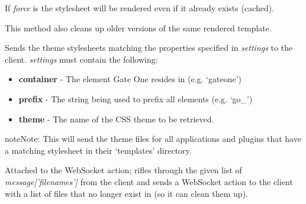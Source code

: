 \documentclass[letterpaper,10pt,openany]{sphinxmanual}
\begin{document}
\begin{fulllineitems}
\begin{fulllineitems}
If \emph{force} is  the stylesheet will be rendered even if it
already exists (cached).

This method also cleans up older versions of the same rendered template.

\end{fulllineitems}


\begin{fulllineitems}
\label{Developer/server:gateone.core.server.ApplicationWebSocket.get_theme}
Sends the theme stylesheets matching the properties specified in
\emph{settings} to the client.  \emph{settings} must contain the following:
\begin{itemize}
\item {} 
\textbf{container} - The element Gate One resides in (e.g. `gateone')

\item {} 
\textbf{prefix} - The string being used to prefix all elements (e.g. `go\_')

\item {} 
\textbf{theme} - The name of the CSS theme to be retrieved.

\end{itemize}

\begin{notice}{note}{Note:}
This will send the theme files for all applications and plugins that
have a matching stylesheet in their `templates' directory.
\end{notice}

\end{fulllineitems}


\begin{fulllineitems}
\label{Developer/server:gateone.core.server.ApplicationWebSocket.cache_cleanup}
Attached to the  WebSocket action; rifles through the
given list of \emph{message{[}'filenames'{]}} from the client and sends a
 WebSocket action to the client with a list of files
that no longer exist in  (so it can clean them up).

\end{fulllineitems}


\end{fulllineitems}
\end{document}
